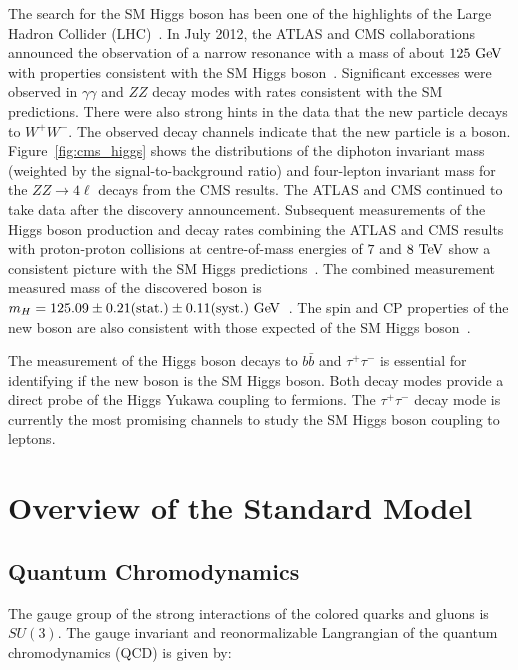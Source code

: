 The search for the SM Higgs boson has been one of the highlights of the Large Hadron Collider (LHC)~\cite{1748-0221-3-08-S08001}. In July 2012, the ATLAS and CMS collaborations announced the observation of a narrow resonance with a mass of about $125~\mathrm{Ge\kern -0.1em V}$ with properties consistent with the SM Higgs boson~\cite{Aad:2012tfa,Chatrchyan:2012xdj}. Significant excesses were observed in $\gamma\gamma$ and $ZZ$ decay modes with rates consistent with the SM predictions. There were also strong hints in the data that the new particle decays to $W^+W^-$. The observed decay channels indicate that the new particle is a boson. Figure~\ref{fig:cms_higgs} shows the distributions of the diphoton invariant mass (weighted by the signal-to-background ratio) and four-lepton invariant mass for the $ZZ \rightarrow 4\ell$ decays from the CMS results. The ATLAS and CMS continued to take data after the discovery announcement. Subsequent measurements of the Higgs boson production and decay rates combining the ATLAS and CMS results with proton-proton collisions at centre-of-mass energies of $7$ and $8~\mathrm{Te\kern -0.1em V}$ show a consistent picture with the SM Higgs predictions~\cite{Khachatryan:2016vau}. The combined measurement measured mass of the discovered boson is $m_{H}=125.09 \pm 0.21 \mathrm{(stat.)} \pm 0.11 \mathrm{(syst.)}~\mathrm{Ge\kern -0.1em V}$~\cite{Aad:2015zhl}. The spin and CP properties of the new boson are also consistent with those expected of the SM Higgs boson~\cite{Chatrchyan:2012jja,Aad:2013xqa,Khachatryan:2014kca}.

The measurement of the Higgs boson decays to $b\bar{b}$ and $\tau^{+}\tau^{-}$ is essential for identifying if the new boson is the SM Higgs boson. Both decay modes provide a direct probe of the Higgs Yukawa coupling to fermions. The $\tau^{+}\tau^{-}$ decay mode is currently the most promising channels to study the SM Higgs boson coupling to leptons.

\section{Overview of the Standard Model}

\subsection{Quantum Chromodynamics}

The gauge group of the strong interactions of the colored quarks and gluons is $SU(3)$. The gauge invariant and reonormalizable Langrangian of the quantum chromodynamics (QCD) is given by:

